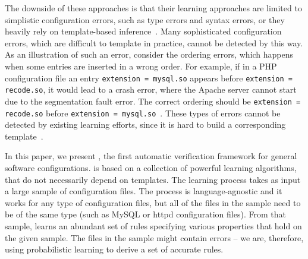 The downside of these approaches is that their learning approaches 
are limited to simplistic configuration errors, 
such as type errors and syntax errors, or they 
heavily rely on template-based inference~\cite{zhang14encore}. 
Many sophisticated configuration errors, 
which are difficult to template in practice, 
cannot be detected by this way. 
As an illustration of such an error, consider the ordering errors, 
which happens when some entries are inserted in a wrong order. 
For example, if in a PHP configuration file 
an entry {\tt extension = mysql.so} appears 
before {\tt extension = recode.so},  
it would lead to a crash error, where the Apache server cannot start 
due to the segmentation fault error. The correct ordering 
should be {\tt extension = recode.so} before 
{\tt extension = mysql.so}~\cite{yin11anempirical}.
These types of errors cannot be detected by existing
learning efforts, 
since it is hard to build a corresponding template~\cite{xu15systems}. 



In this paper, we present \app, the first automatic verification framework
for general software configurations. \app is based on a collection of powerful learning 
algorithms, that do not necessarily depend on templates. The learning process takes as input a
 large sample of configuration files. The process is language-agnostic and it works for any type of configuration files, 
but all of the files in the sample need to be of the same type (such as
MySQL or httpd configuration files).
From that sample,
\app learns an abundant set of rules specifying various properties that hold on the given sample. The files in the sample might contain
errors -- we are, therefore, using probabilistic learning to derive a set of accurate rules. 

